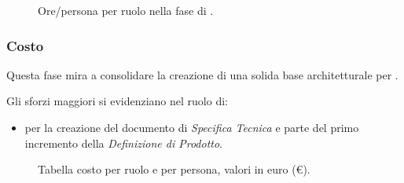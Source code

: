 \begin{figure}[H]
\caption{Ore/persona per ruolo nella fase di \PA.}
\label{fig:pa2}

\end{figure}


\subsubsection{Costo \PA}
\introcosto{\PA}
Questa fase mira a consolidare la creazione di una solida base architetturale per \proj.

Gli sforzi maggiori si evidenziano nel ruolo di:
\begin{itemize}
\item {\PJx} per la creazione del documento di \emph{Specifica Tecnica} e parte del primo incremento della \emph{Definizione di Prodotto}.
\end{itemize}

\begin{figure}[H]
\label{tab:cpa}

  \caption{Tabella costo {\PA} per ruolo e per persona, valori in euro (\euro).}
\end{figure}

